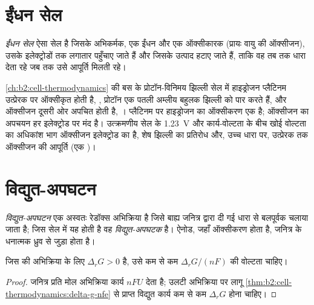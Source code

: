\section{ईंधन सेल}

\begin{definition}[ईंधन सेल]\label{def:b2:batteries-electrolysis:fuel-cell}
\emph{ईंधन सेल} ऐसा सेल है जिसके अभिकर्मक, एक ईंधन और एक
ऑक्सीकारक (प्रायः वायु की ऑक्सीजन), उसके इलेक्ट्रोडों तक लगातार पहुँचाए जाते हैं
और जिसके उत्पाद हटाए जाते हैं, ताकि वह तब तक धारा देता रहे जब तक
उसे आपूर्ति मिलती रहे।
\end{definition}

\cref{ch:b2:cell-thermodynamics} की बस के प्रोटॉन-विनिमय झिल्ली सेल में
हाइड्रोजन प्लैटिनम उत्प्रेरक पर ऑक्सीकृत होती है,
, प्रोटॉन एक पतली अम्लीय बहुलक झिल्ली को पार करते हैं, और ऑक्सीजन
दूसरी ओर अपचित होती है, । प्लैटिनम पर हाइड्रोजन
का ऑक्सीकरण एक  है; ऑक्सीजन का अपचयन हर इलेक्ट्रोड पर
मंद है। उत्क्रमणीय सेल के \qty{1.23}{V} और कार्य-वोल्टता के बीच खोई वोल्टता का
अधिकांश भाग ऑक्सीजन इलेक्ट्रोड का  है,
शेष झिल्ली का प्रतिरोध और, उच्च धारा पर, उत्प्रेरक तक ऑक्सीजन की
आपूर्ति (एक )।

\section{विद्युत-अपघटन}

\begin{definition}[विद्युत-अपघटन]\label{def:b2:batteries-electrolysis:electrolysis}
\emph{विद्युत-अपघटन} एक अस्वतः रेडॉक्स अभिक्रिया है
जिसे बाह्य जनित्र द्वारा दी गई धारा से बलपूर्वक चलाया जाता है; जिस सेल में यह
होती है वह \emph{विद्युत-अपघटक} है। ऐनोड, जहाँ
ऑक्सीकरण होता है, जनित्र के धनात्मक ध्रुव से जुड़ा होता है।
\end{definition}

\begin{proposition}[ऊष्मागतिक न्यूनतम वोल्टता]\label{prop:b2:batteries-electrolysis:minimum-voltage}
जिस  की अभिक्रिया के लिए $\Delta_r G > 0$ है, उसे कम से कम
$\Delta_r G/(nF)$ की वोल्टता चाहिए।
\end{proposition}

\begin{proof}
जनित्र प्रति मोल अभिक्रिया कार्य $nFU$ देता है; उलटी अभिक्रिया पर लागू
\cref{thm:b2:cell-thermodynamics:delta-g-nfe} से प्राप्त विद्युत कार्य कम से कम
$\Delta_r G$ होना चाहिए।
\end{proof}

